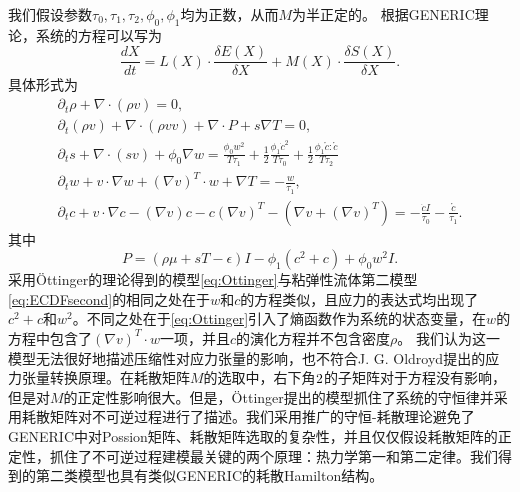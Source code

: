 	我们假设参数$\tau_0,\tau_1,\tau_2,\phi_0,\phi_1$均为正数，从而$M$为半正定的。
	根据GENERIC理论，系统的方程可以写为
	\begin{equation*}
		\frac{dX}{dt} = L(X) \cdot \frac{\delta E(X)}{\delta X} + M(X) \cdot \frac{\delta S(X)}{\delta X} .
	\end{equation*}
	具体形式为
	\begin{subequations}\label{eq:Ottinger}
		\begin{align} 
			\partial_t \rho + \nabla \cdot (\rho v) = 0, \\
			\partial_t (\rho v) + \nabla \cdot (\rho v v ) + \nabla \cdot P + s \nabla T = 0, \\
			\partial_t s + \nabla \cdot (s v) + \phi_0  \nabla w = \frac{\phi_0 w^2}{T \tau_1} + \frac{1}{2} \frac{\phi_1 \dot{c}^2}{T \tau_0} + \frac{1}{2} \frac{\phi_1 \mathring{c}:\mathring{c}}{T \tau_2}  \\
			\partial_t w + v \cdot \nabla w + (\nabla v)^T \cdot w + \nabla T  = -\frac{w}{\tau_1}, \\
			\partial_t c + v \cdot \nabla c - (\nabla v) c - c (\nabla v)^T - (\nabla v + (\nabla v)^T) = -\frac{\dot{c}I}{\tau_0} - \frac{\mathring{c}}{\tau_1}.
		\end{align}
	\end{subequations}
	其中
	\begin{equation*}
		P = (\rho \mu + sT - \epsilon) I  - \phi_1(c^2 + c) + \phi_0 w^2 I.
	\end{equation*}
	采用\"Ottinger的理论得到的模型\eqref{eq:Ottinger}与粘弹性流体第二模型\eqref{eq:ECDFsecond}的相同之处在于$w$和$c$的方程类似，且应力的表达式均出现了$c^2+c$和$w^2$。不同之处在于\eqref{eq:Ottinger}引入了熵函数作为系统的状态变量，在$w$的方程中包含了$(\nabla v)^T \cdot w$一项，并且$c$的演化方程并不包含密度$\rho$。
	我们认为这一模型无法很好地描述压缩性对应力张量的影响，也不符合J. G. Oldroyd提出的应力张量转换原理\cite{oldroyd1950formulation}。在耗散矩阵$M$的选取中，右下角$2\time 2$的子矩阵对于方程没有影响，但是对$M$的正定性影响很大。但是，\"Ottinger提出的模型抓住了系统的守恒律并采用耗散矩阵对不可逆过程进行了描述。我们采用推广的守恒-耗散理论避免了GENERIC中对Possion矩阵、耗散矩阵选取的复杂性，并且仅仅假设耗散矩阵的正定性，抓住了不可逆过程建模最关键的两个原理：热力学第一和第二定律。我们得到的第二类模型也具有类似GENERIC的耗散Hamilton结构。%

